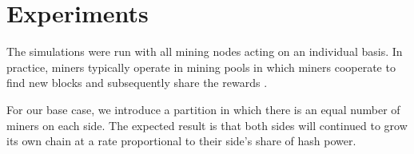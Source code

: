 \section{Experiments}
The simulations were run with all mining nodes acting on an individual basis. In practice, miners typically operate in mining pools in which miners cooperate to find new blocks and subsequently share the rewards \cite{Rosenfeld}. 

For our base case, we introduce a partition in which there is an equal number of miners on each side. The expected result is that both sides will continued to grow its own chain at a rate proportional to their side's share of hash power. 